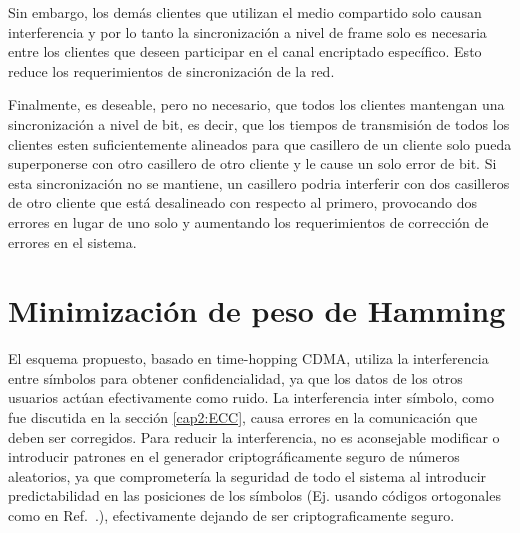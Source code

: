 Sin embargo, los demás clientes que utilizan el medio compartido solo causan interferencia y por lo tanto la sincronización a nivel de frame solo es necesaria entre los clientes que deseen participar en el canal encriptado específico. Esto reduce los requerimientos de sincronización de la red.

Finalmente, es deseable, pero no necesario, que todos los clientes mantengan una sincronización a nivel de bit, es decir, que los tiempos de transmisión de todos los clientes esten suficientemente alineados para que casillero de un cliente solo pueda superponerse con otro casillero de otro cliente y le cause un solo error de bit. Si esta sincronización no se mantiene, un casillero podria interferir con dos casilleros de otro cliente que está desalineado con respecto al primero, provocando dos errores en lugar de uno solo y aumentando los requerimientos de corrección de errores en el sistema.

\section{Minimización de peso de Hamming}

El esquema propuesto, basado en time-hopping CDMA, utiliza la interferencia entre símbolos para obtener confidencialidad, ya que los datos de los otros usuarios actúan efectivamente como ruido.
La interferencia inter símbolo, como fue discutida en la sección \ref{cap2:ECC}, causa errores en la comunicación que deben ser corregidos. Para reducir la interferencia, no es aconsejable modificar o introducir patrones en el generador criptográficamente seguro de números aleatorios, ya que comprometería la seguridad de todo el sistema al introducir predictabilidad en las posiciones de los símbolos (Ej. usando códigos ortogonales como en Ref.~\cite{Nadarajah2006}.), efectivamente dejando de ser criptograficamente seguro.


